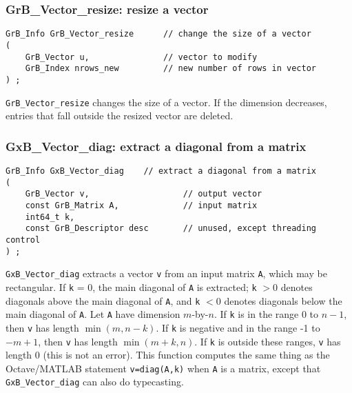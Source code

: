 \documentclass[12pt]{article}
\begin{document}
\subsubsection{{\sf GrB\_Vector\_resize:}          resize a vector}
\label{vector_resize}

\begin{mdframed}[userdefinedwidth=6in]
{\footnotesize
\begin{verbatim}
GrB_Info GrB_Vector_resize      // change the size of a vector
(
    GrB_Vector u,               // vector to modify
    GrB_Index nrows_new         // new number of rows in vector
) ;
\end{verbatim} } \end{mdframed}

\verb'GrB_Vector_resize' changes the size of a vector.  If the dimension
decreases, entries that fall outside the resized vector are deleted.

\subsubsection{{\sf GxB\_Vector\_diag:} extract a diagonal from a matrix}
\label{vector_diag}

\begin{mdframed}[userdefinedwidth=6in]
{\footnotesize
\begin{verbatim}
GrB_Info GxB_Vector_diag    // extract a diagonal from a matrix
(
    GrB_Vector v,                   // output vector
    const GrB_Matrix A,             // input matrix
    int64_t k,
    const GrB_Descriptor desc       // unused, except threading control
) ;
\end{verbatim} } \end{mdframed}


\verb'GxB_Vector_diag' extracts a vector \verb'v' from an input matrix
\verb'A', which may be rectangular.  If \verb'k' = 0, the main diagonal of
\verb'A' is extracted; \verb'k' $> 0$ denotes diagonals above the main diagonal
of \verb'A', and \verb'k' $< 0$ denotes diagonals below the main diagonal of
\verb'A'.  Let \verb'A' have dimension $m$-by-$n$.  If \verb'k' is in the range
0 to $n-1$, then \verb'v' has length $\min(m,n-k)$.  If \verb'k' is negative
and in the range -1 to $-m+1$, then \verb'v' has length $\min(m+k,n)$.  If
\verb'k' is outside these ranges, \verb'v' has length 0 (this is not an error).
This function computes the same thing as the Octave/MATLAB statement
\verb'v=diag(A,k)' when \verb'A' is a matrix, except that
\verb'GxB_Vector_diag' can also do typecasting.
\end{document}
